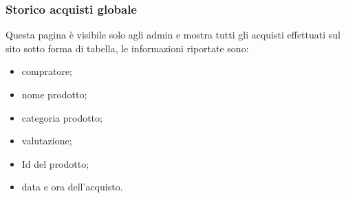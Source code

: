 \subsubsection{Storico acquisti globale}
Questa pagina è visibile solo agli admin e mostra tutti gli acquisti effettuati sul sito sotto forma di tabella, le informazioni riportate sono:
\begin{itemize}
	\item compratore;
	\item nome prodotto;
	\item categoria prodotto;
	\item valutazione;
	\item Id del prodotto;
	\item data e ora dell'acquisto.
\end{itemize}
